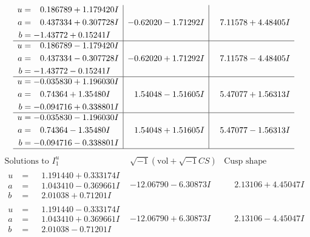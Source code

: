 \documentclass[1p]{elsarticle_modified}
\theoremstyle{definition}
\newcommand{\I}{\sqrt{-1}}
\begin{document}
$$\begin{array}{c|c|c}
\begin{aligned}
u &= \phantom{-}0.186789 + 1.179420 I \\
a &= \phantom{-}0.437334 + 0.307728 I \\
b &= -1.43772 + 0.15241 I\end{aligned}
 & -0.62020 - 1.71292 I & \phantom{-}7.11578 + 4.48405 I \\ \hline\begin{aligned}
u &= \phantom{-}0.186789 - 1.179420 I \\
a &= \phantom{-}0.437334 - 0.307728 I \\
b &= -1.43772 - 0.15241 I\end{aligned}
 & -0.62020 + 1.71292 I & \phantom{-}7.11578 - 4.48405 I \\ \hline\begin{aligned}
u &= -0.035830 + 1.196030 I \\
a &= \phantom{-}0.74364 + 1.35480 I \\
b &= -0.094716 + 0.338801 I\end{aligned}
 & \phantom{-}1.54048 - 1.51605 I & \phantom{-}5.47077 + 1.56313 I \\ \hline\begin{aligned}
u &= -0.035830 - 1.196030 I \\
a &= \phantom{-}0.74364 - 1.35480 I \\
b &= -0.094716 - 0.338801 I\end{aligned}
 & \phantom{-}1.54048 + 1.51605 I & \phantom{-}5.47077 - 1.56313 I\\
 \hline 
 \end{array}$$\newpage$$\begin{array}{c|c|c}  
\text{Solutions to }I^u_{1}& \I (\text{vol} + \sqrt{-1}CS) & \text{Cusp shape}\\
 \hline 
\begin{aligned}
u &= \phantom{-}1.191440 + 0.333174 I \\
a &= \phantom{-}1.043410 - 0.369661 I \\
b &= \phantom{-}2.01038 + 0.71201 I\end{aligned}
 & -12.06790 - 6.30873 I & \phantom{-}2.13106 + 4.45047 I \\ \hline\begin{aligned}
u &= \phantom{-}1.191440 - 0.333174 I \\
a &= \phantom{-}1.043410 + 0.369661 I \\
b &= \phantom{-}2.01038 - 0.71201 I\end{aligned}
 & -12.06790 + 6.30873 I & \phantom{-}2.13106 - 4.45047 I \\ \hline\begin{aligned}

\end{aligned}
\end{array}$$
\end{document}
